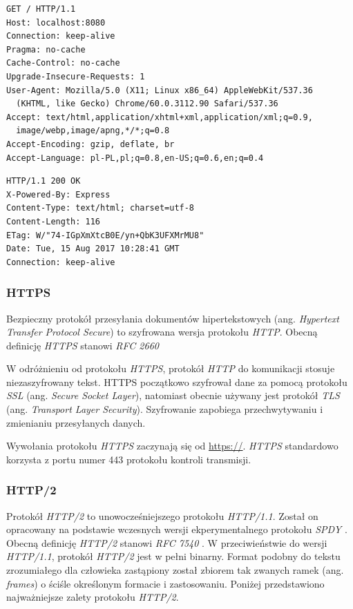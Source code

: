 \documentclass[polish, twoside, 12pt]{mwart}
\begin{document}
\begin{lstlisting}[caption=Przykładowe żądanie \emph{HTTP/1.1}]
GET / HTTP/1.1
Host: localhost:8080
Connection: keep-alive
Pragma: no-cache
Cache-Control: no-cache
Upgrade-Insecure-Requests: 1
User-Agent: Mozilla/5.0 (X11; Linux x86_64) AppleWebKit/537.36 
  (KHTML, like Gecko) Chrome/60.0.3112.90 Safari/537.36
Accept: text/html,application/xhtml+xml,application/xml;q=0.9,
  image/webp,image/apng,*/*;q=0.8
Accept-Encoding: gzip, deflate, br
Accept-Language: pl-PL,pl;q=0.8,en-US;q=0.6,en;q=0.4
\end{lstlisting}

\begin{lstlisting}[caption=Przykładowa odpowiedź \emph{HTTP/1.1}]
HTTP/1.1 200 OK
X-Powered-By: Express
Content-Type: text/html; charset=utf-8
Content-Length: 116
ETag: W/"74-IGpXmXtcB0E/yn+QbK3UFXMrMU8"
Date: Tue, 15 Aug 2017 10:28:41 GMT
Connection: keep-alive
\end{lstlisting}

\subsubsection{HTTPS} \label{https}

Bezpieczny protokół przesyłania dokumentów hipertekstowych (ang. \emph{Hypertext Transfer Protocol Secure}) to szyfrowana wersja protokołu \emph{HTTP}. Obecną definicję \emph{HTTPS} stanowi \emph{RFC 2660} \cite{rfc2660}

W odróżnieniu od protokołu \emph{HTTPS}, protokół \emph{HTTP} do komunikacji stosuje niezaszyfrowany tekst. HTTPS początkowo szyfrował dane za pomocą protokołu \emph{SSL} (ang. \emph{Secure Socket Layer}), natomiast obecnie używany jest protokół \emph{TLS} (ang. \emph{Transport Layer Security}). Szyfrowanie zapobiega przechwytywaniu i zmienianiu przesyłanych danych. 

Wywołania protokołu \emph{HTTPS} zaczynają się od \url{https://}. \emph{HTTPS} standardowo korzysta z portu numer 443 protokołu kontroli transmisji. 

\subsubsection{HTTP/2} \label{http/2}

Protokół \emph{HTTP/2} to unowocześniejszego protokołu \emph{HTTP/1.1}. Został on opracowany na podstawie wczesnych wersji ekperymentalnego protokołu \emph{SPDY} \cite{spdy}. Obecną definicję \emph{HTTP/2} stanowi \emph{RFC 7540} \cite{rfc7540}. W przeciwieństwie do wersji \emph{HTTP/1.1}, protokół \emph{HTTP/2} jest w pełni binarny. Format podobny do tekstu zrozumiałego dla człowieka zastąpiony został zbiorem tak zwanych ramek (ang. \emph{frames}) o ściśle określonym formacie i zastosowaniu. Poniżej przedstawiono najważniejsze zalety protokołu \emph{HTTP/2}.
\end{document}
